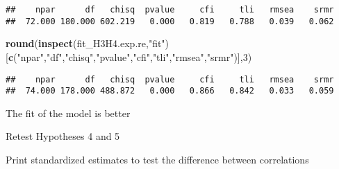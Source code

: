 \documentclass[
]{article}
\newenvironment{Shaded}{\begin{snugshade}}{\end{snugshade}}
\newcommand{\DecValTok}[1]{\textcolor[rgb]{0.00,0.00,0.81}{#1}}
\newcommand{\KeywordTok}[1]{\textcolor[rgb]{0.13,0.29,0.53}{\textbf{#1}}}
\newcommand{\NormalTok}[1]{#1}
\newcommand{\OperatorTok}[1]{\textcolor[rgb]{0.81,0.36,0.00}{\textbf{#1}}}
\newcommand{\StringTok}[1]{\textcolor[rgb]{0.31,0.60,0.02}{#1}}
\begin{document}
\begin{verbatim}
##    npar      df   chisq  pvalue     cfi     tli   rmsea    srmr 
##  72.000 180.000 602.219   0.000   0.819   0.788   0.039   0.062
\end{verbatim}

\begin{Shaded}
\begin{Highlighting}[]
\KeywordTok{round}\NormalTok{(}\KeywordTok{inspect}\NormalTok{(fit_H3H4.exp.re,}\StringTok{"fit"}\NormalTok{)}
\NormalTok{      [}\KeywordTok{c}\NormalTok{(}\StringTok{"npar"}\NormalTok{,}\StringTok{"df"}\NormalTok{,}\StringTok{"chisq"}\NormalTok{,}\StringTok{"pvalue"}\NormalTok{,}\StringTok{"cfi"}\NormalTok{,}\StringTok{"tli"}\NormalTok{,}\StringTok{"rmsea"}\NormalTok{,}\StringTok{"srmr"}\NormalTok{)],}\DecValTok{3}\NormalTok{)}
\end{Highlighting}
\end{Shaded}

\begin{verbatim}
##    npar      df   chisq  pvalue     cfi     tli   rmsea    srmr 
##  74.000 178.000 488.872   0.000   0.866   0.842   0.033   0.059
\end{verbatim}

The fit of the model is better

Retest Hypotheses 4 and 5

Print standardized estimates to test the difference between correlations

\begin{Shaded}
\end{Shaded}
\end{document}
